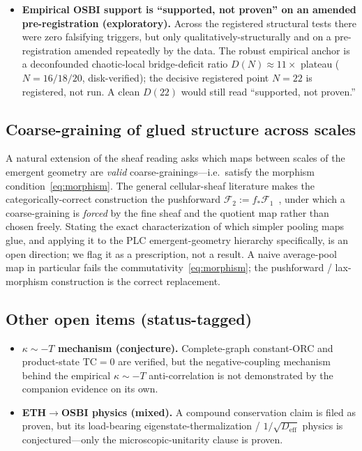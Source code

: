 \documentclass[aps,pra,twocolumn,superscriptaddress,floatfix]{revtex4-2}
\theoremstyle{definition}
\begin{document}
\begin{itemize}
time-extension leg (dynamic tensor tomography is underdetermined without an
exogenous motion model, which here would be the Einstein flow being
derived---circular). The campaign's first prescribed attack route is retired.
This negative is on proven footing, in the same sense as the published anchor
results.
\item \textbf{Empirical OSBI support is ``supported, not proven'' on an amended
pre-registration (exploratory).} Across the registered structural tests there
were zero falsifying triggers, but only qualitatively-structurally and on a
pre-registration amended repeatedly by the data. The robust empirical anchor is
a deconfounded chaotic-local bridge-deficit ratio $D(N)\approx11\times$ plateau
($N=16/18/20$, disk-verified); the decisive registered point $N=22$ is
registered, not run. A clean $D(22)$ would still read ``supported, not proven.''
\end{itemize}

\subsection{Coarse-graining of glued structure across scales}

A natural extension of the sheaf reading asks which maps between scales of the
emergent geometry are \emph{valid} coarse-grainings---i.e.\ satisfy the morphism
condition~\eqref{eq:morphism}. The general cellular-sheaf literature makes the
categorically-correct construction the pushforward
$\mathcal{F}_2:=f_*\mathcal{F}_1$~\cite{curry2014,hansenghrist2019}, under which
a coarse-graining is \emph{forced} by the fine sheaf and the quotient map rather
than chosen freely. Stating the exact characterization of which simpler pooling
maps glue, and applying it to the PLC emergent-geometry hierarchy specifically,
is an open direction; we flag it as a prescription, not a result. A naive
average-pool map in particular fails the commutativity~\eqref{eq:morphism}; the
pushforward / lax-morphism construction is the correct replacement.

\subsection{Other open items (status-tagged)}

\begin{itemize}
\item \textbf{$\kappa\sim-T$ mechanism (conjecture).} Complete-graph
constant-ORC and product-state $\mathrm{TC}=0$ are verified, but the
negative-coupling mechanism behind the empirical $\kappa\sim-T$ anti-correlation
is not demonstrated by the companion evidence on its own.
\item \textbf{ETH$\to$OSBI physics (mixed).} A compound conservation claim is
filed as proven, but its load-bearing eigenstate-thermalization /
$1/\sqrt{D_{\mathrm{eff}}}$ physics is conjectured---only the microscopic-unitarity
clause is proven.
\end{itemize}
\end{document}
